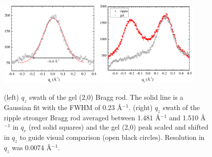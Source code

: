 \begin{figure}[htbp]
  \centering
  \includegraphics[width=0.45\textwidth]{figures/ripple/tWAXS/twaxs_gel_qz}
  \includegraphics[width=0.45\textwidth]{figures/ripple/tWAXS/twaxs_strong_qz}
  \caption[]{(left) $q_z$ swath of the gel (2,0) Bragg rod. The solid line is
  a Gaussian fit with the FWHM of 0.23 \AA$^{-1}$. 
  (right) $q_z$ swath of the ripple stronger Bragg rod averaged between
  1.481 \AA$^{-1}$ and 1.510 \AA$^{-1}$ in $q_r$
  (red solid squares) and the gel (2,0) peak scaled and shifted in $q_z$ to guide 
  visual comparison (open black circles). 
  Resolution in $q_z$ was 0.0074 \AA$^{-1}$.}
  \label{fig:twaxs_gel_qz}
\end{figure}

